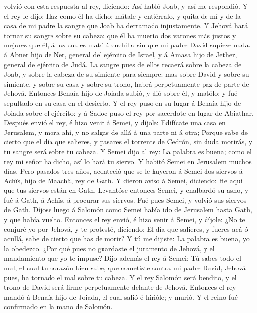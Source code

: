volvió con esta respuesta al rey, diciendo: Así habló Joab, y así me
respondió.  Y el rey le dijo: Haz como él ha dicho;
mátale y entiérralo, y quita de mí y de la casa de mi padre la sangre
que Joab ha derramado injustamente.  Y Jehová hará tornar
su sangre sobre su cabeza: que él ha muerto dos varones más justos y
mejores que él, á los cuales mató á cuchillo sin que mi padre David
supiese nada: á Abner hijo de Ner, general del ejército de Israel, y á
Amasa hijo de Jether, general de ejército de Judá.  La
sangre pues de ellos recaerá sobre la cabeza de Joab, y sobre la cabeza
de su simiente para siempre: mas sobre David y sobre su simiente, y
sobre su casa y sobre su trono, habrá perpetuamente paz de parte de
Jehová.  Entonces Benaía hijo de Joiada subió, y dió
sobre él, y matólo; y fué sepultado en su casa en el desierto.
 Y el rey puso en su lugar á Benaía hijo de Joiada sobre
el ejército: y á Sadoc puso el rey por sacerdote en lugar de Abiathar.
 Después envió el rey, é hizo venir á Semei, y díjole:
Edifícate una casa en Jerusalem, y mora ahí, y no salgas de allá á una
parte ni á otra;  Porque sabe de cierto que el día que
salieres, y pasares el torrente de Cedrón, sin duda morirás, y tu sangre
será sobre tu cabeza.  Y Semei dijo al rey: La palabra es
buena; como el rey mi señor ha dicho, así lo hará tu siervo. Y habitó
Semei en Jerusalem muchos días.  Pero pasados tres años,
aconteció que se le huyeron á Semei dos siervos á Achîs, hijo de Maachâ,
rey de Gath. Y dieron aviso á Semei, diciendo: He aquí que tus siervos
están en Gath.  Levantóse entonces Semei, y enalbardó su
asno, y fué á Gath, á Achîs, á procurar sus siervos. Fué pues Semei, y
volvió sus siervos de Gath.  Díjose luego á Salomón como
Semei había ido de Jerusalem hasta Gath, y que había vuelto.
 Entonces el rey envió, é hizo venir á Semei, y díjole:
¿No te conjuré yo por Jehová, y te protesté, diciendo: El día que
salieres, y fueres acá ó acullá, sabe de cierto que has de morir? Y tú
me dijiste: La palabra es buena, yo la obedezco.  ¿Por
qué pues no guardaste el juramento de Jehová, y el mandamiento que yo te
impuse?  Dijo además el rey á Semei: Tú sabes todo el
mal, el cual tu corazón bien sabe, que cometiste contra mi padre David;
Jehová pues, ha tornado el mal sobre tu cabeza.  Y el rey
Salomón será bendito, y el trono de David será firme perpetuamente
delante de Jehová.  Entonces el rey mandó á Benaía hijo
de Joiada, el cual salió é hirióle; y murió. Y el reino fué confirmado
en la mano de Salomón.


